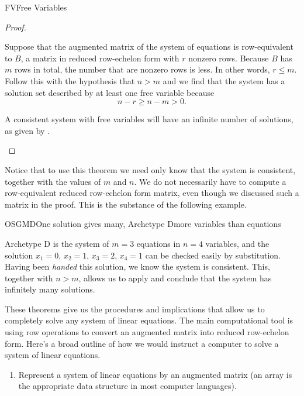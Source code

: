 \begin{subsect}{FV}{Free Variables}
\begin{proof}
\begin{para}Suppose that the augmented matrix of the system of equations is row-equivalent to $B$, a matrix in reduced row-echelon form with $r$ nonzero rows.
Because $B$ has $m$ rows in total, the number that are nonzero rows is less.  In other words, $r\leq m$.
Follow this with the hypothesis that $n>m$ and we find that the system has a solution set described by at least one free variable because
%
\begin{equation*}
n-r\geq n-m>0.
\end{equation*}\end{para}
%
\begin{para}A consistent system with free variables will have an infinite number of solutions, as given by .\end{para}
\end{proof}
%
\begin{para}Notice that to use this theorem we need only know that the system is consistent, together with the values of $m$ and $n$.  We do not necessarily have to compute a row-equivalent reduced row-echelon form matrix, even though we discussed such a matrix in the proof.  This is the substance of the following example.\end{para}
%
\begin{example}{OSGMD}{One solution gives many, Archetype D}{more variables than equations}
\begin{para}Archetype D is the system of $m=3$ equations in $n=4$ variables,
%
%
and the solution $x_1 = 0$, $x_2 = 1$, $x_3 = 2$, $x_4 = 1$ can be checked easily by substitution.  Having been {\em handed} this solution, we know the system is consistent.  This, together with $n>m$, allows us to apply  and conclude that the system has infinitely many solutions.
\end{para}
\end{example}
%
\begin{para}These theorems give us the procedures and implications that allow us to completely solve any system of linear equations.  The main computational tool is using row operations to convert an augmented matrix into reduced row-echelon form.  Here's a broad outline of how we would instruct a computer to solve  a system of linear equations.
%
\begin{enumerate}
\item  Represent a system of linear equations by an augmented matrix (an array is the appropriate data structure in most computer languages).

\end{enumerate}
\end{para}
\end{subsect}
